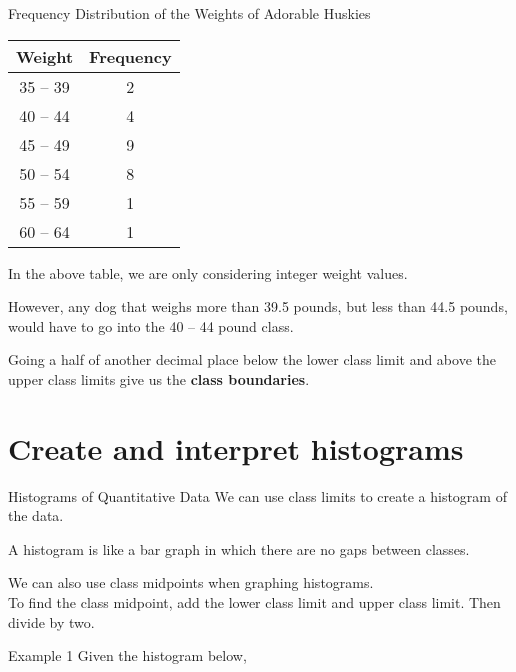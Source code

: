 \documentclass[t]{beamer}
\begin{document}
\begin{frame}{Frequency Distribution of the Weights of Adorable Huskies}
\begin{center}
\begin{tabular}{c|c}
\textbf{Weight} & \textbf{Frequency} \\ \hline
35 -- 39 & 2 \\
40 -- 44 & 4 \\
45 -- 49 & 9 \\
50 -- 54 & 8 \\
55 -- 59 & 1 \\
60 -- 64 & 1 \\
\end{tabular}
\end{center}
\pause
In the above table, we are only considering integer weight values.	\newline\\	\pause

However, any dog that weighs more than 39.5 pounds, but less than 44.5 pounds, would have to go into the 40 -- 44 pound class. \newline\\	\pause

Going a half of another decimal place below the lower class limit and above the upper class limits give us the {\color{blue}\textbf{class boundaries}}.
\end{frame}

\section{Create and interpret histograms}

\begin{frame}{Histograms of Quantitative Data}
We can use class limits to create a histogram of the data.	\newline\\	\pause

A histogram is like a bar graph in which there are no gaps between classes.		\pause

\begin{center}
\end{center}
\pause We can also use class midpoints when graphing histograms. \pause \newline\\

To find the class midpoint, add the lower class limit and upper class limit. Then divide by two.
\end{frame}

\begin{frame}{Example 1}
Given the histogram below, 
\end{frame}
\end{document}
